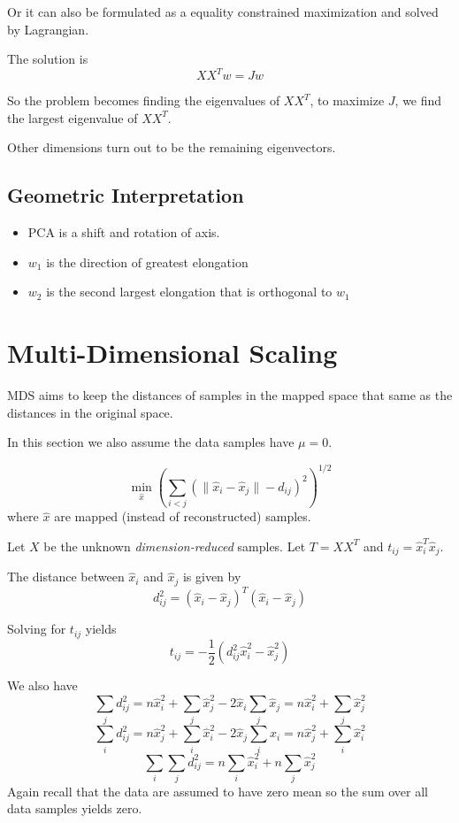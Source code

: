        Or it can also be formulated as a equality constrained maximization and solved by Lagrangian.

        The solution is
        \[ XX^Tw=Jw \]

        So the problem becomes finding the eigenvalues of $XX^T$, to maximize $J$, we find the largest eigenvalue of $XX^T$.

        Other dimensions turn out to be the remaining eigenvectors.

    \subsection{Geometric Interpretation}
        \begin{itemize}
            \item PCA is a shift and rotation of axis.
            \item $w_1$ is the direction of greatest elongation
            \item $w_2$ is the second largest elongation that is orthogonal to $w_1$
        \end{itemize}


\section{Multi-Dimensional Scaling}
    MDS aims to keep the distances of samples in the mapped space that same as the distances in the original space.

    In this section we also assume the data samples have $\mu=0$.

    \[ \min_{\hat{x}} \left(\sum_{i<j}\left( \|\hat{x}_i-\hat{x}_j\| - d_{ij} \right)^2\right)^{1/2} \]
    where $\hat{x}$ are mapped (instead of reconstructed) samples.

    Let $X$ be the unknown \emph{dimension-reduced} samples. Let $T=XX^T$ and $t_{ij}=\hat{x}_i^T\hat{x}_j$.

    The distance between $\hat{x}_i$ and $\hat{x}_j$ is given by
    \[d_{ij}^2 = (\hat{x}_i-\hat{x}_j)^T(\hat{x}_i-\hat{x}_j)\]

    Solving for $t_{ij}$ yields
    \[ t_{ij} = -\frac{1}{2}(d_{ij}^2\hat{x}_i^2-\hat{x}_j^2) \]

    We also have
    \[\sum_j d_{ij}^2 = n\hat{x}_i^2 + \sum_j\hat{x}_j^2 - 2\hat{x}_i\sum_j\hat{x}_j = n\hat{x}_i^2 + \sum_j\hat{x}_j^2\]
    \[\sum_i d_{ij}^2 = n\hat{x}_j^2 + \sum_i\hat{x}_i^2 - 2\hat{x}_j\sum_i\hat{x}_i = n\hat{x}_j^2 + \sum_i\hat{x}_i^2\]
    \[\sum_{i}\sum_{j}d_{ij}^2=n\sum_i\hat{x}_i^2 + n\sum_j\hat{x}_j^2 \]
    Again recall that the data are assumed to have zero mean so the sum over all data samples yields zero.

